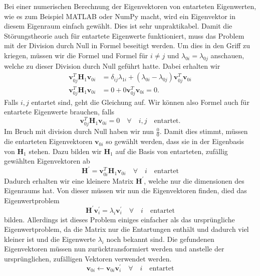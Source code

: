 Bei einer numerischen Berechnung der Eigenvektoren von entarteten Eigenwerten, wie es zum Beispiel MATLAB oder NumPy macht, wird ein Eigenvektor in diesem Eigenraum einfach gewählt.
Dies ist sehr unpraktikabel.
Damit die Störungstheorie auch für entartete Eigenwerte funktioniert, muss das Problem mit der Division durch Null in Formel  beseitigt werden.
Um dies in den Griff zu kriegen, müssen wir die Formel und Formel  für $i \neq j$ und $\lambda_{0i} = \lambda_{0j}$ anschauen, welche zu dieser Division durch Null geführt hatte.
Dabei erhalten wir
\begin{align}
    \bm v_{0j}^T \bm H_1 \bm v_{0i}
    &=
    \delta_{ij} \lambda_{1i} +
    ( \lambda_{0i} - \lambda_{0j} )
    \bm v_{0j}^T  \bm v_{0i}
    \\
    \bm v_{0j}^T \bm H_1 \bm v_{0i}
    &=
    0 +
    0
    \bm v_{0j}^T  \bm v_{0i}
    = 0.
\end{align}
Falls $i, j$ entartet sind, geht die Gleichung auf.
Wir können also Formel  auch für entartete Eigenwerte brauchen, falls
\begin{equation}
    \bm v_{0j}^T \bm H_1 \bm v_{0i} = 0 \quad \forall \quad i,j \quad \text{entartet}.
\end{equation} \label{ew:eq:condition-degenerated}
Im Bruch mit division durch Null haben wir nun $\frac{0}{0}$.
Damit dies stimmt, müssen die entarteten Eigenvektoren $\bm v_{0i}$ so gewählt werden, dass sie in der Eigenbasis von $\bm H_1$ stehen. %
Dazu bilden wir $\bm H_1$ auf die Basis von entarteten, zufällig gewählten Eigenvektoren ab
\begin{equation*}
    \bm H^\prime = \bm v_{0i}^T \bm H_1 \bm v_{0i} \quad \forall \quad i \quad \text{entartet}
\end{equation*}
Dadurch erhalten wir eine kleinere Matrix $\bm H^\prime$, welche nur die dimensionen des Eigenraums hat.
Von dieser müssen wir nun die Eigenvektoren finden, died das Eigenwertproblem
\begin{equation*}
    \bm H^\prime \bm v_{i}^\prime = \lambda_{i} \bm v_i^\prime \quad \forall \quad i \quad \text{entartet}
\end{equation*}
bilden.
Allerdings ist dieses Problem einiges einfacher als das ursprüngliche Eigenwertproblem, da die Matrix nur die Entartungen enthält und dadurch viel kleiner ist und die Eigenwerte $\lambda_i$ noch bekannt sind.
Die gefundenen Eigenvektoren müssen nun zurücktransformiert werden und anstelle der ursprünglichen, zufälligen Vektoren verwendet werden.
\begin{equation*}
    \bm v_{0i} \gets \bm v_{0i} \bm v_{i}^\prime \quad \forall \quad i \quad \text{entartet}
\end{equation*}

